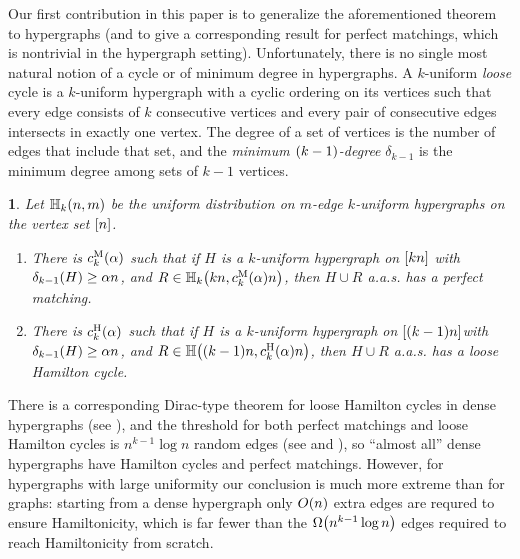 \documentclass[11pt,english]{article}
\theoremstyle{plain}
\newtheorem{thm}{\protect\theoremname}
\theoremstyle{definition}
\theoremstyle{definition}
\theoremstyle{plain}
\theoremstyle{plain}
\theoremstyle{plain}
\theoremstyle{plain}
\theoremstyle{remark}
\theoremstyle{remark}
\let\originalleft\left
\let\originalright\right
\renewcommand{\left}{\mathopen{}\mathclose\bgroup\originalleft}
\renewcommand{\right}{\aftergroup\egroup\originalright}
\providecommand{\theoremname}{Theorem}
\begin{document}
Our first contribution in this paper is to generalize the aforementioned
theorem to hypergraphs (and to give a corresponding result for perfect
matchings, which is nontrivial in the hypergraph setting). Unfortunately,
there is no single most natural notion of a cycle or of minimum degree
in hypergraphs. A $k$-uniform \emph{loose} cycle is a $k$-uniform
hypergraph with a cyclic ordering on its vertices such that every
edge consists of $k$ consecutive vertices and every pair of consecutive
edges intersects in exactly one vertex. The degree of a set of vertices
is the number of edges that include that set, and the \emph{minimum
$\left(k-1\right)$-degree }$\delta_{k-1}$ is the minimum degree
among sets of $k-1$ vertices.
\begin{thm}
\label{thm:hypergraph-theorems}Let $\HH_{k}\left(n,m\right)$ be
the uniform distribution on $m$-edge $k$-uniform hypergraphs on
the vertex set $\range n$.

\begin{enumerate}[topsep=0px,label=(\alph*)]

\item{There is $\chypmat\left(\alpha\right)$ such that if $H$ is
a $k$-uniform hypergraph on $\left[kn\right]$ with $\delta_{k-1}\left(H\right)\ge\alpha n$,
and $R\in\HH_{k}\left(kn,\chypmat\left(\alpha\right)n\right)$, then
$H\cup R$ a.a.s. has a perfect matching.}

\item{There is $\chypham\left(\alpha\right)$ such that if $H$ is
a $k$-uniform hypergraph on $\left[\left(k-1\right)n\right]$with
$\delta_{k-1}\left(H\right)\ge\alpha n$, and $R\in\HH\left(\left(k-1\right)n,\chypham\left(\alpha\right)n\right)$,
then $H\cup R$ a.a.s. has a loose Hamilton cycle.}

\end{enumerate}
\end{thm}
There is a corresponding Dirac-type theorem for loose Hamilton cycles
in dense hypergraphs (see \cite{KKMO11}), and the threshold for both
perfect matchings and loose Hamilton cycles is $n^{k-1}\log n$ random
edges (see \cite{DF11} and \cite[Corollary~2.6]{JKV08}), so ``almost
all'' dense hypergraphs have Hamilton cycles and perfect matchings.
However, for hypergraphs with large uniformity our conclusion is much
more extreme than for graphs: starting from a dense hypergraph only
$O\left(n\right)$ extra edges are requred to ensure Hamiltonicity,
which is far fewer than the $\Omega\left(n^{k-1}\log n\right)$ edges
required to reach Hamiltonicity from scratch.
\end{document}

